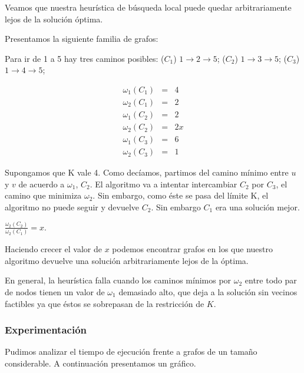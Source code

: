 Veamos que nuestra heurística de búsqueda local puede quedar arbitrariamente lejos de la solución óptima.

Presentamos la siguiente familia de grafos:


Para ir de 1 a 5 hay tres caminos posibles: ($C_1$) $1 \rightarrow 2 \rightarrow 5$; ($C_2$) $1 \rightarrow 3 \rightarrow 5$;
($C_3$) $1 \rightarrow 4 \rightarrow 5$;

\begin{eqnarray}
 \omega_1(C_1) &=& 4	\\ 
 \omega_2(C_1) &=& 2	\\
 \omega_1(C_2) &=& 2	\\
 \omega_2(C_2) &=& 2x   \\
 \omega_1(C_3) &=& 6	\\
 \omega_2(C_3) &=& 1
\end{eqnarray}

Supongamos que K vale 4.
Como decíamos, partimos del camino mínimo entre $u$ y $v$ de acuerdo a $\omega_1$, $C_2$. El algoritmo va a intentar intercambiar $C_2$ por
$C_3$, el camino que minimiza $\omega_2$. Sin embargo, como éste se pasa del límite K, el algoritmo no puede seguir y devuelve $C_2$. Sin
embargo $C_1$ era una solución mejor.

$\frac{\omega_2(C_2)}{\omega_2(C_1)} = x$.

Haciendo crecer el valor de $x$ podemos encontrar grafos en los que nuestro algoritmo devuelve una
solución arbitrariamente lejos de la óptima.

En general, la heurística falla cuando los caminos mínimos por $\omega_2$ entre todo par de nodos tienen un valor de $\omega_1$ demasiado alto, que deja a la solución sin vecinos factibles ya que éstos se sobrepasan de la restricción de $K$.
\newpage

\subsubsection{Experimentación}

Pudimos analizar el tiempo de ejecución frente a grafos de un tamaño considerable. A continuación presentamos un gráfico.

